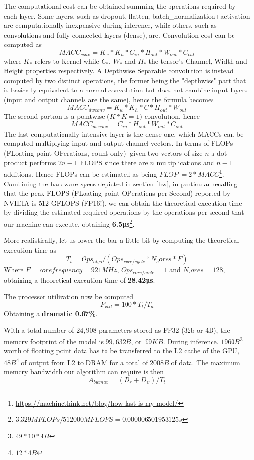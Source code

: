 \documentclass{article}
\begin{document}
The computational cost can be obtained summing the operations required by each layer. Some layers, such as dropout, flatten, batch\_normalization+activation are computationally inexpensive during inference, while others, such as convolutions and fully connected layers (dense), are. Convolution cost can be computed as \[MACC_{conv} = K_w * K_h * C_{in} * H_{out} * W_{out} * C_{out}\] where \(K_*\) refers to Kernel while \(C_*\), \(W_*\) and \(H_*\) the tensor's Channel, Width and Height properties respectively. A Depthwise Separable convolution is instead computed by two distinct operations, the former being the "depthwise" part that is basically equivalent to a normal convolution but does not combine input layers (input and output channels are the same), hence the formula becomes \[MACC_{dwconv} = K_w * K_h * C * H_{out} * W_{out}\]
The second portion is a pointwise (\(K*K=1)\) convolution, hence \[MACC_{pwconv} = C_{in} * H_{out} * W_{out} * C_{out}\]
The last computationally intensive layer is the dense one, which MACCs can be computed multiplying input and output channel vectors.
In terms of FLOPs (FLoating point OPerations, count only), given two vectors of size \(n\) a dot product performs \(2n - 1\) FLOPS since there are \(n\) multiplications and \(n - 1\) additions. Hence FLOPs can be estimated as being \(FLOP ~= 2*MACC\)\footnote{\url{https://machinethink.net/blog/how-fast-is-my-model/}}.
Combining the hardware specs depicted in section \ref{hw}, in particular recalling that the peak FLOPS (FLoating point OPerations per Second) reported by NVIDIA is 512 GFLOPS (FP16!), we can obtain the theoretical execution time by dividing the estimated required operations by the operations per second that our machine can execute, obtaining \textbf{6.5µs}\footnote{\(3.329MFLOPs / 512000MFLOPS = 0.000006501953125s\)}.

More realistically, let us lower the bar a little bit by computing the theoretical execution time as
\[T_t = Ops_{algo} / (Ops_{core/cycle} * N_cores * F)\]
Where \(F = core frequency = 921MHz\), \(Ops_{core/cycle} = 1\) and \(N_cores = 128\), obtaining a theoretical execution time of \textbf{28.42µs}.

The processor utilization now be computed
\[P_{util} = 100 * T_t / T_a\]
Obtaining a \textbf{dramatic 0.67\%}.

With a total number of \(24,908\) parameters stored as FP32 (32b or 4B), the memory footprint of the model is \(99,632B\), or \(~99KB\).
During inference, \(1960B\)\footnote{\(49*10*4B\)} worth of floating point data has to be transferred to the L2 cache of the GPU, \(48B\)\footnote{\(12*4B\)} of output from L2 to DRAM for a total of \(2008B\) of data. The maximum memory bandwidth our algorithm can require is then
\[A_{bwmax} = (D_r + D_w) / T_t\]
\end{document}
